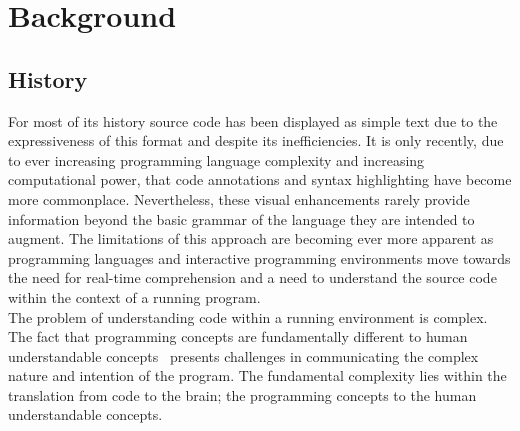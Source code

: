 




\section{Background}

\subsection{History}

For most of its history source code has been displayed as simple text due to the expressiveness of this format and despite its inefficiencies. It is only recently, due to ever increasing programming language complexity and increasing computational power, that code annotations and syntax highlighting have become more commonplace. Nevertheless, these visual enhancements rarely provide information beyond the basic grammar of the language they are intended to augment. The limitations of this approach are becoming ever more apparent as programming languages and interactive programming environments move towards the need for real-time comprehension and a need to understand the source code within the context of a running program.\\

The problem of understanding code within a running environment is complex. The fact that programming concepts are fundamentally different to human understandable concepts~\cite{Biggerstaff1994} presents challenges in communicating the complex nature and intention of the program. The fundamental complexity lies within the translation from code to the brain; the programming concepts to the human understandable concepts.\\

